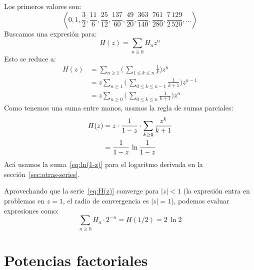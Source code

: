   Los primeros valores son:
  \begin{equation*}
    \left\langle
      0, 1, \frac{3}{2}, \frac{11}{6}, \frac{25}{12},
      \frac{137}{60},  \frac{49}{20}, \frac{363}{140},
      \frac{761}{280}, \frac{7\,129}{2\,520},
      \dotsc
    \right\rangle
  \end{equation*}
  Buscamos una expresión para:
  \begin{equation}
    \label{eq:harmonic-number-ogf}
    H(z)
      = \sum_{n \ge 0} H_n z^n
  \end{equation}
  Esto se reduce a:
  \begin{align*}
    H(z)
      &= \sum_{n \ge 1} \biggl( \,
			  \sum_{1 \le k \le n} \frac{1}{k}
			\biggr) z^n \\
      &= z \sum_{n \ge 1} \biggl( \,
			     \sum_{0 \le k \le n - 1}
			       \frac{1}{k + 1}
			   \biggr) z^{n - 1} \\
      &= z \sum_{n \ge 0} \biggl( \,
			     \sum_{0 \le k \le n} \frac{1}{k + 1}
			   \biggr) z^n
  \end{align*}
  Como tenemos una suma entre manos,
  usamos la regla de sumas parciales:%
  \begin{align}
    H(z)
      &= z \cdot \frac{1}{1 - z}
	   \cdot \sum_{k \ge 0} \frac{z^k}{k + 1}
	   \notag \\
      &= \frac{1}{1 - z} \, \ln \frac{1}{1 - z}
	   \label{eq:H(z)}
  \end{align}
  Acá usamos la suma~\eqref{eq:ln(1-z)} para el logaritmo
  derivada en la sección~\ref{sec:otras-series}.

  Aprovechando que la serie~\eqref{eq:H(z)}
  converge para \(\lvert z \rvert < 1\)
  (la expresión entra en problemas en \(z = 1\),
   el radio de convergencia es \(\lvert z \rvert = 1\)),
  podemos evaluar expresiones como:
  \begin{equation*}
    \sum_{n \ge 0} H_n \cdot 2^{-n}
      = H(1 / 2)
      = 2 \, \ln 2
  \end{equation*}



\section{Potencias factoriales}
\label{sec:potencias-factoriales}

